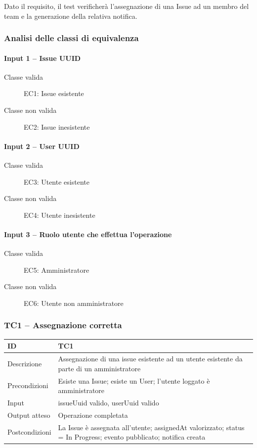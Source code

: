\documentclass[a4paper,12pt]{article}
\begin{document}
Dato il requisito, il test verificherà l'assegnazione di una Issue ad un membro del team e la generazione della relativa notifica.
\subsubsection{Analisi delle classi di equivalenza}

\paragraph{Input 1 -- Issue UUID}
\begin{description}
    \item[Classe valida] EC1: Issue esistente
    \item[Classe non valida] EC2: Issue inesistente
\end{description}

\paragraph{Input 2 -- User UUID}
\begin{description}
    \item[Classe valida] EC3: Utente esistente
    \item[Classe non valida] EC4: Utente inesistente
\end{description}

\paragraph{Input 3 -- Ruolo utente che effettua l'operazione}
\begin{description}
    \item[Classe valida] EC5: Amministratore
    \item[Classe non valida] EC6: Utente non amministratore
\end{description}

\subsubsection{TC1 -- Assegnazione corretta}
\label{sec:TC1}

\begin{tabularx}{\textwidth}{p{5cm}|X}
ID & TC1 \\ \hline
Descrizione & Assegnazione di una issue esistente ad un utente esistente da parte di un amministratore \\ \hline
Precondizioni & Esiste una Issue; esiste un User; l'utente loggato è amministratore \\ \hline
Input & issueUuid valido, userUuid valido \\ \hline
Output atteso & Operazione completata \\ \hline
Postcondizioni & La Issue è assegnata all'utente; assignedAt valorizzato; status = In Progress; evento pubblicato; notifica creata \\ \hline
\end{tabularx}
\end{document}
